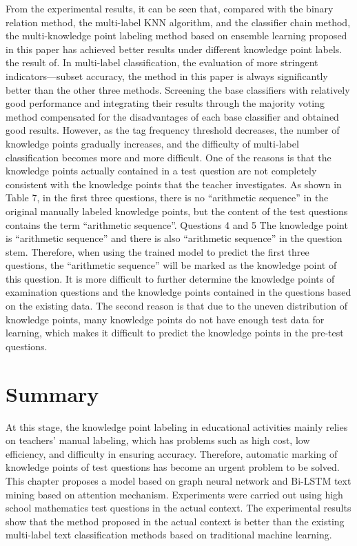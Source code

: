 From the experimental results, it can be seen that, compared with the binary relation method, the multi-label KNN algorithm, and the classifier chain method, the multi-knowledge point labeling method based on ensemble learning proposed in this paper has achieved better results under different knowledge point labels. the result of. In multi-label classification, the evaluation of more stringent indicators—subset accuracy, the method in this paper is always significantly better than the other three methods. Screening the base classifiers with relatively good performance and integrating their results through the majority voting method compensated for the disadvantages of each base classifier and obtained good results. However, as the tag frequency threshold decreases, the number of knowledge points gradually increases, and the difficulty of multi-label classification becomes more and more difficult. One of the reasons is that the knowledge points actually contained in a test question are not completely consistent with the knowledge points that the teacher investigates. As shown in Table 7, in the first three questions, there is no ``arithmetic sequence'' in the original manually labeled knowledge points, but the content of the test questions contains the term ``arithmetic sequence''. Questions 4 and 5 The knowledge point is ``arithmetic sequence'' and there is also ``arithmetic sequence'' in the question stem. Therefore, when using the trained model to predict the first three questions, the ``arithmetic sequence'' will be marked as the knowledge point of this question. It is more difficult to further determine the knowledge points of examination questions and the knowledge points contained in the questions based on the existing data. The second reason is that due to the uneven distribution of knowledge points, many knowledge points do not have enough test data for learning, which makes it difficult to predict the knowledge points in the pre-test questions.
\section{Summary}
At this stage, the knowledge point labeling in educational activities mainly relies on teachers' manual labeling, which has problems such as high cost, low efficiency, and difficulty in ensuring accuracy. Therefore, automatic marking of knowledge points of test questions has become an urgent problem to be solved. This chapter proposes a model based on graph neural network and Bi-LSTM text mining based on attention mechanism. Experiments were carried out using high school mathematics test questions in the actual context. The experimental results show that the method proposed in the actual context is better than the existing multi-label text classification methods based on traditional machine learning.

